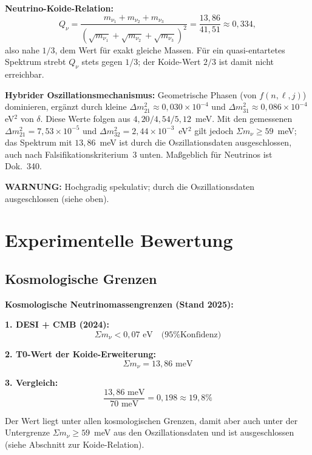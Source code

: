 \begin{koidebox}
		\textbf{Neutrino-Koide-Relation:}
		\begin{equation}
			Q_\nu = \frac{m_{\nu_1} + m_{\nu_2} + m_{\nu_3}}{\left( \sqrt{m_{\nu_1}} + \sqrt{m_{\nu_2}} + \sqrt{m_{\nu_3}} \right)^2} = \frac{13,86}{41,51} \approx 0,334,
		\end{equation}
		also nahe $1/3$, dem Wert für exakt gleiche Massen.
		Für ein quasi-entartetes Spektrum strebt $Q_\nu$ stets gegen $1/3$; der Koide-Wert $2/3$ ist damit nicht erreichbar.
		
		\textbf{Hybrider Oszillationsmechanismus:}
		Geometrische Phasen (von $f(n,\ell,j)$) dominieren, ergänzt durch kleine $\Delta m^2_{21} \approx 0,030 \times 10^{-4}$ und $\Delta m^2_{31} \approx 0,086 \times 10^{-4}$ eV$^2$ von $\delta$.
				Diese Werte folgen aus $4,20/4,54/5,12$~meV. Mit den gemessenen $\Delta m^2_{21} = 7,53 \times 10^{-5}$ und $\Delta m^2_{32} = 2,44 \times 10^{-3}$~eV$^2$ gilt jedoch $\Sigma m_\nu \geq 59$~meV; das Spektrum mit $13,86$~meV ist durch die Oszillationsdaten ausgeschlossen, auch nach Falsifikationskriterium~3 unten. Maßgeblich für Neutrinos ist Dok.~340.

		\textbf{WARNUNG:} Hochgradig spekulativ; durch die Oszillationsdaten ausgeschlossen (siehe oben).
	\end{koidebox}
	
	\section{Experimentelle Bewertung}
	
	\subsection{Kosmologische Grenzen}
	
	\begin{experimental}
		\textbf{Kosmologische Neutrinomassengrenzen (Stand 2025):}
		
		\textbf{1. DESI + CMB (2024):}
		\begin{equation}
			\Sigma m_\nu < 0,07 \text{ eV} \quad \text{(95\% Konfidenz)}
		\end{equation}
		
		\textbf{2. T0-Wert der Koide-Erweiterung:}
		\begin{equation}
			\Sigma m_\nu = 13,86 \text{ meV}
		\end{equation}
		
		\textbf{3. Vergleich:}
		\begin{equation}
			\frac{13,86 \text{ meV}}{70 \text{ meV}} = 0,198 \approx 19,8\%
		\end{equation}
		
		Der Wert liegt unter allen kosmologischen Grenzen, damit aber auch unter der Untergrenze $\Sigma m_\nu \geq 59$~meV aus den Oszillationsdaten und ist ausgeschlossen (siehe Abschnitt zur Koide-Relation).
	\end{experimental}
	
